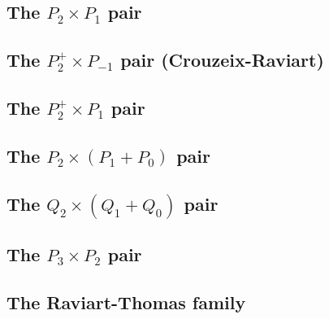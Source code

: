 \subsection{The ${ P}_2\times P_1$ pair \label{ss:p2p1}}


\subsection{The ${ P}_2^+\times P_{-1}$ pair  (Crouzeix-Raviart) }
\label{sec:crouzeix-raviart}


\subsection{The ${ P}_2^+\times P_{1}$ pair \label{ss:p2pp1}}


\subsection{The ${ P}_2\times (P_1+P_0)$ pair} \label{ss:p2p1p0}


\subsection{The ${ Q}_2\times (Q_1+Q_0)$ pair} \label{ss:q2q1q0}


\subsection{The ${ P}_3\times P_2$ pair} \label{ss:p3p2}


\subsection{The Raviart-Thomas family} \label{ss:raviart_thomas}


